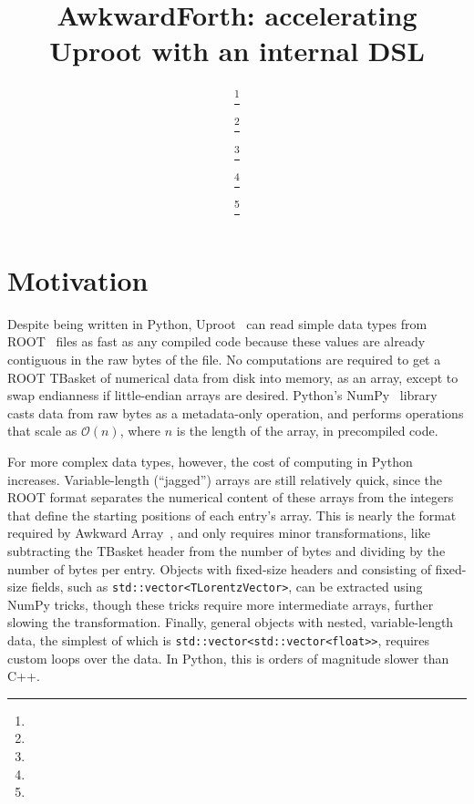 \documentclass{webofc}
\begin{document}
\title{AwkwardForth: accelerating Uproot with an internal DSL}

\author{ \fnsep\thanks{} \and
         \fnsep\thanks{} \and
         \fnsep\thanks{} \and
         \fnsep\thanks{} \and
         \fnsep\thanks{}}



\maketitle

\section{Motivation}

Despite being written in Python, Uproot~\cite{uproot} can read simple data types from ROOT~\cite{root} files as fast as any compiled code because these values are already contiguous in the raw bytes of the file. No computations are required to get a ROOT TBasket of numerical data from disk into memory, as an array, except to swap endianness if little-endian arrays are desired. Python's NumPy~\cite{numpy} library casts data from raw bytes as a metadata-only operation, and performs operations that scale as $\mathcal{O}(n)$, where $n$ is the length of the array, in precompiled code.

For more complex data types, however, the cost of computing in Python increases. Variable-length (``jagged'') arrays are still relatively quick, since the ROOT format separates the numerical content of these arrays from the integers that define the starting positions of each entry's array. This is nearly the format required by Awkward Array~\cite{awkward}, and only requires minor transformations, like subtracting the TBasket header from the number of bytes and dividing by the number of bytes per entry. Objects with fixed-size headers and consisting of fixed-size fields, such as \texttt{std::vector<TLorentzVector>}, can be extracted using NumPy tricks, though these tricks require more intermediate arrays, further slowing the transformation. Finally, general objects with nested, variable-length data, the simplest of which is \texttt{std::vector<std::vector<float>>}, requires custom loops over the data. In Python, this is orders of magnitude slower than C++.
\end{document}
